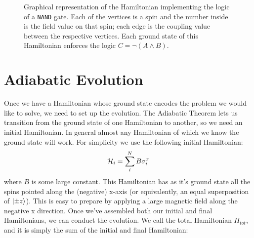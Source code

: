 \begin{figure}
	\begin{center}
	\end{center}
	\caption[\texttt{NAND} Graph]{Graphical representation of the Hamiltonian implementing the logic of a \texttt{NAND} gate.  Each of the vertices is a spin and the number inside is the field value on that spin; each edge is the coupling value between the respective vertices.  Each ground state of this Hamiltonian enforces the logic $C = \neg(A \wedge B)$.}
	\label{fig:nand_graph}
\end{figure}



\section{Adiabatic Evolution}
Once we have a Hamiltonian whose ground state encodes the problem we would like to solve, we need to set up the evolution.  The Adiabatic Theorem lets us transition from the ground state of one Hamiltonian to another, so we need an initial Hamiltonian.  In general almost any Hamiltonian of which we know the ground state will work.  For simplicity we use the following initial Hamiltonian:
\begin{equation}
	\mathcal{H}_i = \sum_i^N B \sigma_i^x
\end{equation}
where $B$ is some large constant.  This Hamiltonian has as it's ground state all the spins pointed along the (negative) x-axis (or equivalently, an equal superposition of $\mathinner{|{\pm z}\rangle}$).  This is easy to prepare by applying a large magnetic field along the negative x direction.
Once we've assembled both our initial and final Hamiltonians, we can conduct the evolution.  We call the total Hamiltonian $H_{tot}$, and it is simply the sum of the initial and final Hamiltonian:

